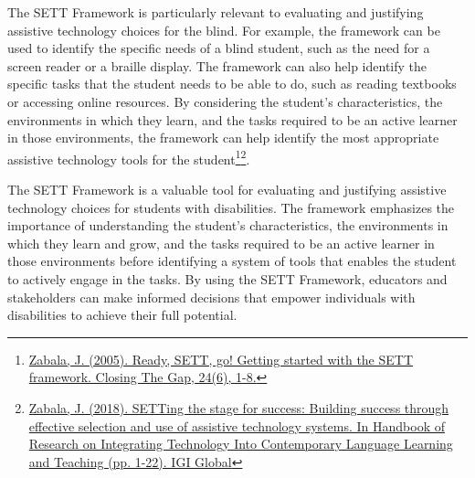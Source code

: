 The SETT Framework is particularly relevant to evaluating and justifying assistive technology choices for the blind. For example, the framework can be used to identify the specific needs of a blind student, such as the need for a screen reader or a braille display. The framework can also help identify the specific tasks that the student needs to be able to do, such as reading textbooks or accessing online resources. By considering the student’s characteristics, the environments in which they learn, and the tasks required to be an active learner in those environments, the framework can help identify the most appropriate assistive technology tools for the student\footnote{\raggedright \href{https://www.joyzabala.com/uploads/1/0/9/0/109073507/ready_sett_go.pdf}{Zabala, J. (2005). Ready, SETT, go! Getting started with the SETT framework. Closing The Gap, 24(6), 1-8.} }\footnote{\raggedright \href{https://www.researchgate.net/profile/Joy-Zabala/publication/237798275_SETTing_the_Stage_for_Success_Building_Success_through_Effective_Selection_and_Use_of_Assistive_Technology_Systems/links/56452b9208aef646e6cc24d9/SETTing-the-Stage-for-Success-Building-Success-through-Effective-Selection-and-Use-of-Assistive-Technology-Systems.pdf?origin=publication_detail}{Zabala, J. (2018). SETTing the stage for success: Building success through effective selection and use of assistive technology systems. In Handbook of Research on Integrating Technology Into Contemporary Language Learning and Teaching (pp. 1-22). IGI Global}}.

The SETT Framework is a valuable tool for evaluating and justifying assistive technology choices for students with disabilities. The framework emphasizes the importance of understanding the student’s characteristics, the environments in which they learn and grow, and the tasks required to be an active learner in those environments before identifying a system of tools that enables the student to actively engage in the tasks. By using the SETT Framework, educators and stakeholders can make informed decisions that empower individuals with disabilities to achieve their full potential.

